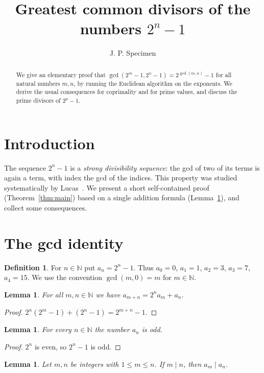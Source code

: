 \documentclass[11pt]{amsart}
\title{Greatest common divisors of the numbers $2^n-1$}
\author{J. P. Specimen}
\date{}
\newtheorem{lemma}[theorem]{Lemma}
\theoremstyle{definition}
\newtheorem{definition}[theorem]{Definition}
\theoremstyle{remark}
\begin{document}
\begin{abstract}
We give an elementary proof that $\gcd(2^m-1,2^n-1)=2^{\gcd(m,n)}-1$ for all
natural numbers $m,n$, by running the Euclidean algorithm on the exponents.
We derive the usual consequences for coprimality and for prime values, and
discuss the prime divisors of $2^p-1$.
\end{abstract}

\maketitle

\section{Introduction}

The sequence $2^n-1$ is a \emph{strong divisibility sequence}: the gcd of two
of its terms is again a term, with index the gcd of the indices. This
property was studied systematically by Lucas~\cite{Luc}. We present a short
self-contained proof (Theorem~\ref{thm:main}) based on a single addition
formula (Lemma~\ref{lem:add}), and collect some consequences.

\section{The gcd identity}

\begin{definition}\label{def:a}
For $n\in\mathbb{N}$ put $a_n=2^n-1$. Thus $a_0=0$, $a_1=1$, $a_2=3$,
$a_3=7$, $a_4=15$. We use the convention $\gcd(m,0)=m$ for $m\in\mathbb{N}$.
\end{definition}

\begin{lemma}\label{lem:add}
For all $m,n\in\mathbb{N}$ we have $a_{m+n}=2^n a_m+a_n$.
\end{lemma}

\begin{proof}
$2^n(2^m-1)+(2^n-1)=2^{m+n}-1$.
\end{proof}

\begin{lemma}\label{lem:odd}
For every $n\in\mathbb{N}$ the number $a_n$ is odd.
\end{lemma}

\begin{proof}
$2^n$ is even, so $2^n-1$ is odd.
\end{proof}

\begin{lemma}\label{lem:div}
Let $m,n$ be integers with $1\le m\le n$. If $m\mid n$, then $a_m\mid a_n$.
\end{lemma}
\end{document}
